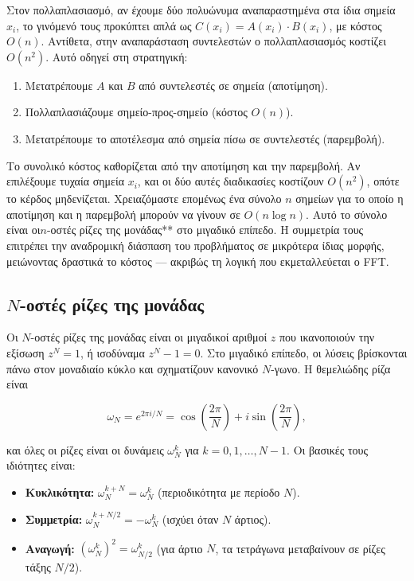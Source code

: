 \documentclass[a4paper, 11pt]{article}
\providecommand{\tightlist}{\setlength{\itemsep}{0pt}\setlength{\parskip}{0pt}}
\begin{document}
Στον πολλαπλασιασμό, αν έχουμε δύο πολυώνυμα αναπαραστημένα στα ίδια
σημεία \(x_i\), το γινόμενό τους προκύπτει απλά ως
\(C(x_i) = A(x_i) \cdot B(x_i)\), με κόστος \(O(n)\). Αντίθετα, στην
αναπαράσταση συντελεστών ο πολλαπλασιασμός κοστίζει \(O(n^2)\). Αυτό
οδηγεί στη στρατηγική:

\begin{enumerate}
\def\labelenumi{\arabic{enumi}.}
\tightlist
\item
  Μετατρέπουμε \(A\) και \(B\) από συντελεστές σε σημεία (αποτίμηση).
\item
  Πολλαπλασιάζουμε σημείο-προς-σημείο (κόστος \(O(n)\)).
\item
  Μετατρέπουμε το αποτέλεσμα από σημεία πίσω σε συντελεστές (παρεμβολή).
\end{enumerate}

Το συνολικό κόστος καθορίζεται από την αποτίμηση και την παρεμβολή. Αν
επιλέξουμε τυχαία σημεία \(x_i\), και οι δύο αυτές διαδικασίες κοστίζουν
\(O(n^2)\), οπότε το κέρδος μηδενίζεται. Χρειαζόμαστε επομένως ένα
σύνολο \(n\) σημείων για το οποίο η αποτίμηση και η παρεμβολή μπορούν να
γίνουν σε \(O(n \log n)\). Αυτό το σύνολο είναι οι\(n\)-οστές ρίζες της
μονάδας** στο μιγαδικό επίπεδο. Η συμμετρία τους επιτρέπει την
αναδρομική διάσπαση του προβλήματος σε μικρότερα ίδιας μορφής,
μειώνοντας δραστικά το κόστος --- ακριβώς τη λογική που εκμεταλλεύεται ο
FFT.

\subsection{\texorpdfstring{\(N\)-οστές ρίζες της
μονάδας}{N-οστές ρίζες της μονάδας}}\label{n-ux3bfux3c3ux3c4ux3adux3c2-ux3c1ux3afux3b6ux3b5ux3c2-ux3c4ux3b7ux3c2-ux3bcux3bfux3bdux3acux3b4ux3b1ux3c2}

Οι \(N\)-οστές ρίζες της μονάδας είναι οι μιγαδικοί αριθμοί \(z\) που
ικανοποιούν την εξίσωση \(z^N = 1\), ή ισοδύναμα \(z^N - 1 = 0\). Στο
μιγαδικό επίπεδο, οι λύσεις βρίσκονται πάνω στον μοναδιαίο κύκλο και
σχηματίζουν κανονικό \(N\)-γωνο. Η θεμελιώδης ρίζα είναι

\[
\omega_N = e^{2\pi i / N} = \cos\left(\frac{2\pi}{N}\right) + i \sin\left(\frac{2\pi}{N}\right),
\]

και όλες οι ρίζες είναι οι δυνάμεις \(\omega_N^k\) για
\(k = 0,1,\dots,N-1\). Οι βασικές τους ιδιότητες είναι:

\begin{itemize}
\tightlist
\item
  \textbf{Κυκλικότητα:} \(\omega_N^{k+N} = \omega_N^k\) (περιοδικότητα
  με περίοδο \(N\)).
\item
  \textbf{Συμμετρία:} \(\omega_N^{k+N/2} = -\omega_N^k\) (ισχύει όταν
  \(N\) άρτιος).
\item
  \textbf{Αναγωγή:} \((\omega_N^k)^2 = \omega_{N/2}^k\) (για άρτιο
  \(N\), τα τετράγωνα μεταβαίνουν σε ρίζες τάξης \(N/2\)).
\end{itemize}
\end{document}
